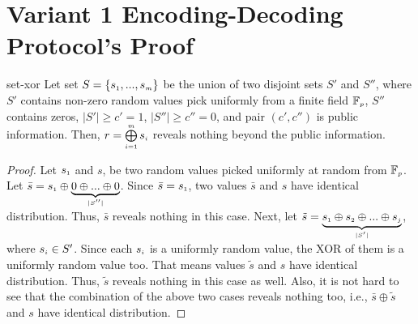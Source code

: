 

\section{Variant 1 Encoding-Decoding Protocol's Proof}\label{sec::Variant-1-Theorem-proof}

\begin{reptheorem}{set-xor}
Let set $S=\{s_{\scriptscriptstyle 1},..., s_{\scriptscriptstyle m}\}$ be the union of  two disjoint sets $S'$ and $S''$, where $S'$ contains non-zero random values pick uniformly  from a finite field $\mathbb{F}_{\scriptscriptstyle p}$, $S''$ contains zeros, $|S'|\geq c'=1$, $|S''|\geq c''=0$, and pair $(c',c'')$ is public information. Then, $r= \bigoplus\limits^{\scriptscriptstyle m}_{\scriptscriptstyle i=1} s_{\scriptscriptstyle i}$ reveals nothing beyond the public information.  
\end{reptheorem}

\begin{proof}
Let $s_{\scriptscriptstyle 1}$ and $s$, be two random values picked uniformly at random from $\mathbb{F}_{\scriptscriptstyle p}$. Let $\bar s=s_{\scriptscriptstyle 1}\oplus \underbrace{0\oplus... \oplus 0}_{\scriptscriptstyle |S''|}$. Since  $\bar s=s_{\scriptscriptstyle 1}$, two values $\bar s$ and $s$ have identical distribution. Thus, $\bar s$ reveals nothing in this case. Next, let $\tilde s=\underbrace{ s_{\scriptscriptstyle 1}\oplus s_{\scriptscriptstyle 2}\oplus... \oplus s_{\scriptscriptstyle j}}_{\scriptscriptstyle |S'|}$, where $s_{\scriptscriptstyle i}\in S'$. Since each $s_{\scriptscriptstyle i}$ is a uniformly random value,  the XOR of them is a uniformly random value too. That means values $\tilde s$ and $s$ have identical distribution. Thus, $\tilde s$ reveals nothing in this case as well. Also, it is not hard to see that the combination of the above two cases reveals nothing too, i.e., $\bar s\oplus \tilde s$ and $s$ have    identical distribution. 
%
\end{proof}